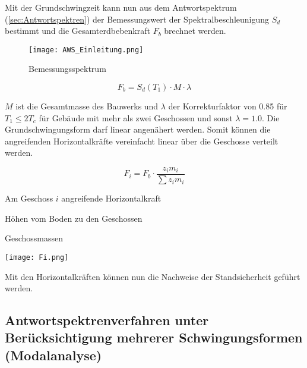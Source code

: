 Mit der Grundschwingzeit kann nun aus dem Antwortspektrum (\cref{sec:Antwortspektren}) der Bemessungswert der Spektralbeschleunigung $S_d$ bestimmt und die Gesamterdbebenkraft $F_b$ brechnet werden.

\begin{figure}[H]
    \centering
    \texttt{[image: AWS\_Einleitung.png]}
    \caption{Bemessungsspektrum}
\end{figure}

\pagebreak

\begin{equation*}
F_b = S_d(T_1) \cdot M \cdot \lambda
\end{equation*}

$M$ ist die Gesamtmasse des Bauwerks und $\lambda$ der Korrekturfaktor von 0.85 für $T_1 \leq 2T_c$ für Gebäude mit mehr als zwei Geschossen und sonst $\lambda=1.0$.
Die Grundschwingungsform darf linear angenähert werden. Somit können die angreifenden Horizontalkräfte vereinfacht linear über die Geschosse verteilt werden.

\begin{minipage}{0.6\textwidth}

\begin{equation*}
F_i = F_b \cdot \frac{z_i m_i}{\sum z_i m_i}
\end{equation*}

\vspace{2ex}
\vspace{2ex}

  Am Geschoss $i$ angreifende Horizontalkraft\par
{}  Höhen vom Boden zu den Geschossen\par
{}  Geschossmassen\par

\end{minipage}%
\hfill
\begin{minipage}{0.4\textwidth}

\begin{flushright}
\texttt{[image: Fi.png]}
\end{flushright}

\end{minipage}%

Mit den Horizontalkräften können nun die Nachweise der Standsicherheit geführt werden.

\subsection{Antwortspektrenverfahren unter Berücksichtigung mehrerer Schwingungsformen (Modalanalyse)}
\label{sec:Modalanalyse}

